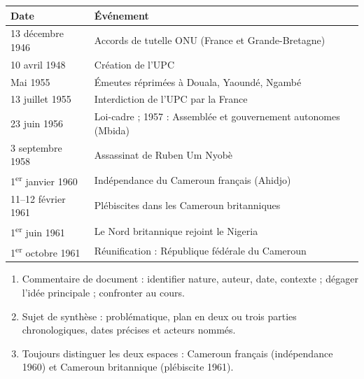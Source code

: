 \documentclass[11pt]{article}
\begin{document}
\begin{aretenir}
\begin{center}
\begin{tabularx}{\linewidth}{|l|X|}\hline
\rowcolor{popblueL} \textbf{Date} & \textbf{Événement} \\ \hline
13 décembre 1946 & Accords de tutelle ONU (France et Grande-Bretagne) \\ \hline
10 avril 1948 & Création de l'UPC \\ \hline
Mai 1955 & Émeutes réprimées à Douala, Yaoundé, Ngambé \\ \hline
13 juillet 1955 & Interdiction de l'UPC par la France \\ \hline
23 juin 1956 & Loi-cadre ; 1957 : Assemblée et gouvernement autonomes (Mbida) \\ \hline
3 septembre 1958 & Assassinat de Ruben Um Nyobè \\ \hline
1\textsuperscript{er} janvier 1960 & Indépendance du Cameroun français (Ahidjo) \\ \hline
11--12 février 1961 & Plébiscites dans les Cameroun britanniques \\ \hline
1\textsuperscript{er} juin 1961 & Le Nord britannique rejoint le Nigeria \\ \hline
1\textsuperscript{er} octobre 1961 & Réunification : République fédérale du Cameroun \\ \hline
\end{tabularx}
\end{center}
\end{aretenir}

\begin{methode}
\begin{enumerate}
  \item Commentaire de document : identifier nature, auteur, date, contexte ; dégager l'idée principale ; confronter au cours.
  \item Sujet de synthèse : problématique, plan en deux ou trois parties chronologiques, dates précises et acteurs nommés.
  \item Toujours distinguer les deux espaces : Cameroun français (indépendance 1960) et Cameroun britannique (plébiscite 1961).
\end{enumerate}
\end{methode}
\end{document}
